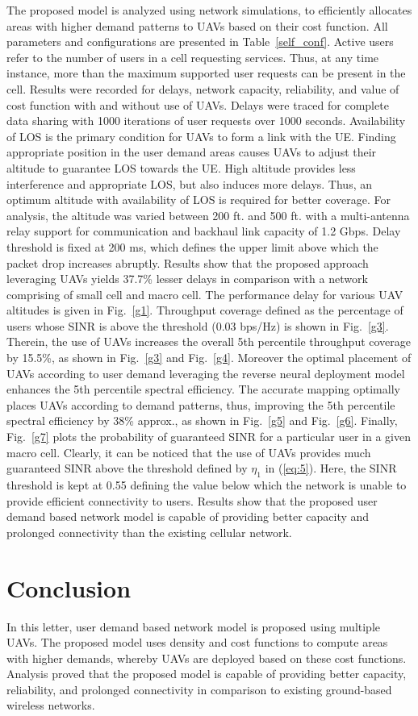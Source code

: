 \documentclass[journal]{IEEEtran}
\begin{document}
The proposed model is analyzed using network simulations, to efficiently allocates areas with higher demand patterns to UAVs based on their cost function. All parameters and configurations are presented in Table~\ref{self_conf}. Active users refer to the number of users in a cell requesting services. Thus, at any time instance, more than the maximum supported user requests can be present in the cell. Results were recorded for delays, network capacity, reliability, and value of cost function with and without use of UAVs. Delays were traced for complete data sharing with 1000 iterations of user requests over 1000 seconds. Availability of LOS is the primary condition for UAVs to form a link with the UE. Finding appropriate position in the user demand areas causes UAVs to adjust their altitude to guarantee LOS towards the UE. High altitude provides less interference and appropriate LOS, but also induces more delays. Thus, an optimum altitude with availability of LOS is required for better coverage. For analysis, the altitude was varied between 200 ft. and 500 ft. with a multi-antenna relay support for communication and backhaul link capacity of 1.2 Gbps. Delay threshold is fixed at 200 ms, which defines the upper limit above which the packet drop increases abruptly. Results show that the proposed approach leveraging UAVs yields 37.7\% lesser delays in comparison with a network comprising of small cell and macro cell. The performance delay for various UAV altitudes is given in Fig.~\ref{g1}. Throughput coverage defined as the percentage of users whose SINR is above the threshold (0.03 bps/Hz) is shown in Fig.~\ref{g3}. Therein, the use of UAVs increases the overall 5th percentile throughput coverage by 15.5\%, as shown in Fig.~\ref{g3} and Fig.~\ref{g4}. Moreover the optimal placement of UAVs according to user demand leveraging the reverse neural deployment model enhances the 5th percentile spectral efficiency. The accurate mapping optimally places UAVs according to demand patterns, thus, improving the 5th percentile spectral efficiency by 38\% approx., as shown in Fig.~\ref{g5} and Fig.~\ref{g6}. Finally, Fig.~\ref{g7} plots the probability of guaranteed SINR for a particular user in a given macro cell. Clearly, it can be noticed that the use of UAVs provides much guaranteed SINR above the threshold defined by $\eta_{1}$ in (\ref{eq:5}). Here, the SINR threshold is kept at 0.55 defining the value below which the network is unable to provide efficient connectivity to users. Results show that the proposed user demand based network model is capable of providing better capacity and prolonged connectivity than the existing cellular network.
\section{Conclusion}
In this letter, user demand based network model is proposed using multiple UAVs. The proposed model uses density and cost functions to compute areas with higher demands, whereby UAVs are deployed based on these cost functions. Analysis proved that the proposed model is capable of providing better capacity, reliability, and prolonged connectivity in comparison to existing ground-based wireless networks.

\nocite{*}

\end{document}
